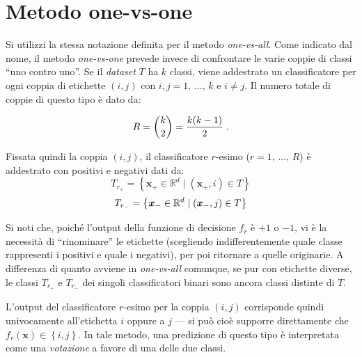 
\section{Metodo one-vs-one}

Si utilizzi la stessa notazione definita per il metodo \textit{one-vs-all}.
Come indicato dal nome, il metodo \textit{one-vs-one} prevede invece di confrontare le varie coppie di classi ``uno contro uno''. Se il \textit{dataset} $T$ ha $k$ classi, viene addestrato un classificatore per ogni coppia di etichette $(i, j)$ con $i, j = 1, \,...,\, k$ e $i \neq j$.
Il numero totale di coppie di questo tipo è dato da:

\begin{equation}
	R = {k \choose 2} = \frac{k(k-1)}{2} \;.
	\vspace{2mm}
\end{equation}

Fissata quindi la coppia $(i, j)$, il classificatore $r$-esimo ($r = 1, \,...,\, R$) è addestrato con positivi e negativi dati da:
\begin{equation}
	T_{r_+} = \left\{ \boldsymbol{x}_+ \in \mathbb{R}^d \;|\; (\boldsymbol{x}_+, i) \in T \right\}	
\end{equation}
\begin{equation}
	T_{r_-} = \left\{ \boldsymbol{x}_- \in \mathbb{R}^d \;|\; (\boldsymbol{x}_-, j) \in T \right\}
\vspace{2mm}	
\end{equation}

Si noti che, poiché l'output della funzione di decisione $f_r$ è $+1$ o $-1$, vi è la necessità di ``rinominare'' le etichette (scegliendo indifferentemente quale classe rappresenti i positivi e quale i negativi), per poi ritornare a quelle originarie.
A differenza di quanto avviene in \textit{one-vs-all} comunque, se pur con etichette diverse, le classi $T_{r_+}$ e $T_{r_-}$ dei singoli classificatori binari sono ancora classi distinte di $T$.

L'output del classificatore $r$-esimo per la coppia $(i, j)$ corrisponde quindi univocamente all'etichetta $i$ oppure a $j$ --- si può cioè supporre direttamente che $f_r(\boldsymbol{x}) \in  \left\{ i, j \right\}$. In tale metodo, una predizione di questo tipo è interpretata come una \textit{votazione} a favore di una delle due classi.

